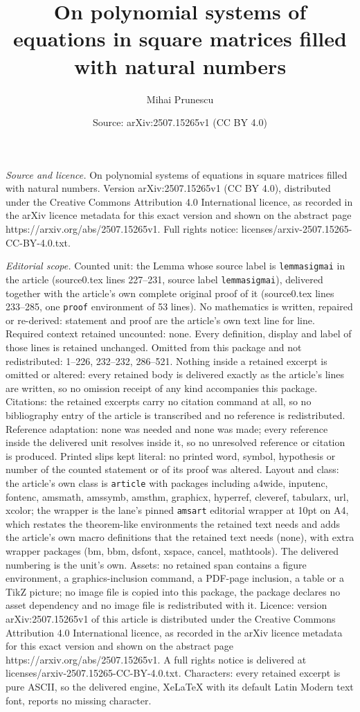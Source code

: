 \documentclass[10pt,a4paper]{amsart}
\title[On polynomial systems of equations in square matrices filled]{On polynomial systems of equations in square matrices filled with natural numbers}
\author{Mihai Prunescu}
\date{Source: arXiv:2507.15265v1 (CC BY 4.0)}
\begin{document}
\maketitle

\noindent\emph{Source and licence.} On polynomial systems of equations in square matrices filled with natural numbers. Version arXiv:2507.15265v1 (CC BY 4.0), distributed under the Creative Commons Attribution 4.0 International licence, as recorded in the arXiv licence metadata for this exact version and shown on the abstract page https://arxiv.org/abs/2507.15265v1. Full rights notice: licenses/arxiv-2507.15265-CC-BY-4.0.txt.\par\smallskip

\noindent\textit{Editorial scope.} Counted unit: the Lemma whose source label is \texttt{lemmasigmai} in the article (source0.tex lines 227--231, source label \texttt{lemmasigmai}), delivered together with the article's own complete original proof of it (source0.tex lines 233--285, one \texttt{proof} environment of 53 lines). No mathematics is written, repaired or re-derived: statement and proof are the article's own text line for line. Required context retained uncounted: none. Every definition, display and label of those lines is retained unchanged. Omitted from this package and not redistributed: 1--226, 232--232, 286--521. Nothing inside a retained excerpt is omitted or altered: every retained body is delivered exactly as the article's lines are written, so no omission receipt of any kind accompanies this package. Citations: the retained excerpts carry no citation command at all, so no bibliography entry of the article is transcribed and no reference is redistributed. Reference adaptation: none was needed and none was made; every reference inside the delivered unit resolves inside it, so no unresolved reference or citation is produced. Printed slips kept literal: no printed word, symbol, hypothesis or number of the counted statement or of its proof was altered. Layout and class: the article's own class is \texttt{article} with packages including a4wide, inputenc, fontenc, amsmath, amssymb, amsthm, graphicx, hyperref, cleveref, tabularx, url, xcolor; the wrapper is the lane's pinned \texttt{amsart} editorial wrapper at 10pt on A4, which restates the theorem-like environments the retained text needs and adds the article's own macro definitions that the retained text needs (none), with extra wrapper packages (bm, bbm, dsfont, xspace, cancel, mathtools). The delivered numbering is the unit's own. Assets: no retained span contains a figure environment, a graphics-inclusion command, a PDF-page inclusion, a table or a TikZ picture; no image file is copied into this package, the package declares no asset dependency and no image file is redistributed with it. Licence: version arXiv:2507.15265v1 of this article is distributed under the Creative Commons Attribution 4.0 International licence, as recorded in the arXiv licence metadata for this exact version and shown on the abstract page https://arxiv.org/abs/2507.15265v1. A full rights notice is delivered at licenses/arxiv-2507.15265-CC-BY-4.0.txt. Characters: every retained excerpt is pure ASCII, so the delivered engine, XeLaTeX with its default Latin Modern text font, reports no missing character.
\end{document}
